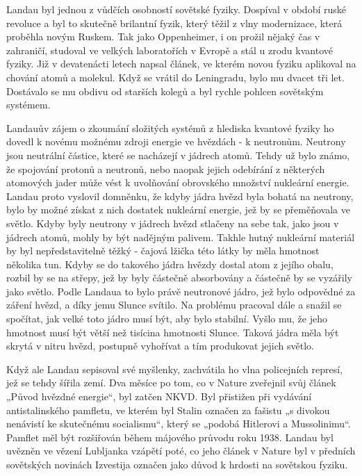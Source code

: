   Landau byl jednou z vůdčích osobností sovětské fyziky. Dospíval v období ruské revoluce a byl to
  skutečně brilantní fyzik, který těžil z vlny modernizace, která proběhla novým Ruskem. Tak jako
  Oppenheimer, i on prožil nějaký čas v zahraničí, studoval ve velkých laboratořích v Evropě a stál
  u zrodu kvantové fyziky. Již v devatenácti letech napsal článek, ve kterém novou fyziku aplikoval
  na chování atomů a molekul. Když se vrátil do Leningradu, bylo mu dvacet tři let. Dostávalo se mu
  obdivu od starších kolegů a byl rychle pohlcen sovětským systémem. 
  
  Landauův zájem o zkoumání složitých systémů z hlediska kvantové fyziky ho dovedl k novému možnému
  zdroji energie ve hvězdách - k neutronům. Neutrony jsou neutrální částice, které se nacházejí v
  jádrech atomů. Tehdy už bylo známo, že spojování protonů a neutronů, nebo naopak jejich odebírání
  z některých atomových jader může vést k uvolňování obrovského množství nukleární energie. Landau
  proto vyslovil domněnku, že kdyby jádra hvězd byla bohatá na neutrony, bylo by možné získat z nich
  dostatek nukleární energie, jež by se přeměňovala ve světlo. Kdyby byly neutrony v jádrech hvězd
  stlačeny na sebe tak, jako jsou v jádrech atomů, mohly by být nadějným palivem. Takhle hutný
  nukleární materiál by byl nepředstavitelně těžký - čajová lžička této látky by měla hmotnost
  několika tun. Kdyby se do takového jádra hvězdy dostal atom z jejího obalu, rozbil by se na
  střepy, jež by byly částečně absorbovány a částečně by se vyzářily jako světlo. Podle Landaua to
  bylo právě neutronové jádro, jež bylo odpovědné za záření hvězd, a díky jemu Slunce svítilo. Na
  problému pracoval dále a snažil se spočítat, jak velké toto jádro musí být, aby bylo stabilní.
  Vyšlo mu, že jeho hmotnost musí být větší než tisícina hmotnosti Slunce. Taková jádra měla být
  skrytá v nitru hvězd, postupně vyhořívat a tím produkovat jejich světlo. 
  
  Když ale Landau sepisoval své myšlenky, zachvátila ho vlna policejních represí, jež se tehdy
  šířila zemí. Dva měsíce po tom, co v Nature zveřejnil svůj článek „Původ hvězdné energie“, byl
  zatčen NKVD. Byl přistižen při vydávání antistalinského pamfletu, ve kterém byl Stalin označen za
  fašistu „s divokou nenávistí ke skutečnému socialismu“, který se „podobá Hitlerovi a Mussolinimu“.
  Pamflet měl být rozšiřován během májového průvodu roku 1938. Landau byl uvězněn ve vězení
  Lubljanka vzápětí poté, co jeho článek v Nature byl v předních sovětských novinách Izvestija
  označen jako důvod k hrdosti na sovětskou fyziku. 
  
